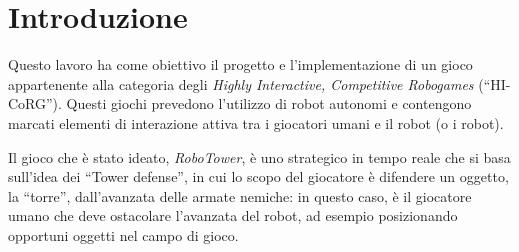 \chapter{Introduzione}
\label{cap:introduzione}

Questo lavoro ha come obiettivo il progetto e l'implementazione di un gioco appartenente alla categoria degli \emph{Highly Interactive, Competitive Robogames} (``HI-CoRG''). Questi giochi prevedono l'utilizzo di robot autonomi e contengono marcati elementi di interazione attiva tra i giocatori umani e il robot (o i robot).

Il gioco che è stato ideato, \emph{RoboTower}, è uno strategico in tempo reale che si basa sull'idea dei ``Tower defense'', in cui lo scopo del giocatore è difendere un oggetto, la ``torre'', dall'avanzata delle armate nemiche: in questo caso, è il giocatore umano che deve ostacolare l'avanzata del robot, ad esempio posizionando opportuni oggetti nel campo di gioco.